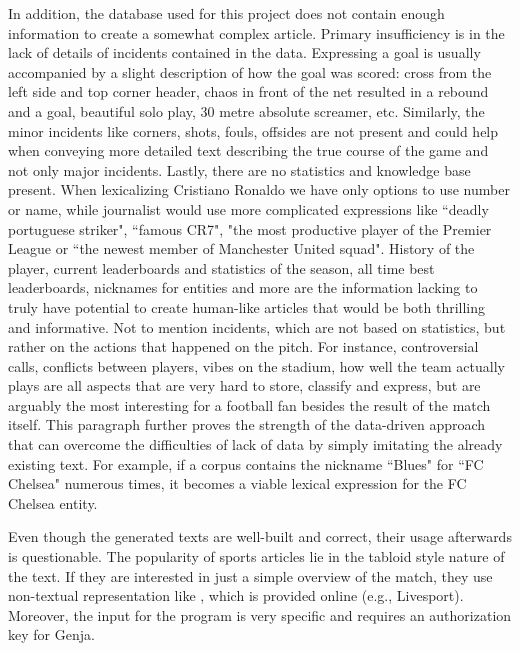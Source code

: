 In addition, the database used for this project does not contain enough information to create a somewhat complex article. Primary insufficiency is in the lack of details of incidents contained in the data. Expressing a goal is usually accompanied by a slight description of how the goal was scored: cross from the left side and top corner header, chaos in front of the net resulted in a rebound and a goal, beautiful solo play, 30 metre absolute screamer, etc. Similarly, the minor incidents like corners, shots, fouls, offsides are not present and could help when conveying more detailed text describing the true course of the game and not only major incidents. Lastly, there are no statistics and knowledge base present. When lexicalizing Cristiano Ronaldo we have only options to use number or name, while journalist would use more complicated expressions like ``deadly portuguese striker", ``famous CR7", "the most productive player of the Premier League or ``the newest member of Manchester United squad". History of the player, current leaderboards and statistics of the season, all time best leaderboards, nicknames for entities and more are the information lacking to truly have potential to create human-like articles that would be both thrilling and informative. Not to mention incidents, which are not based on statistics, but rather on the actions that happened on the pitch. For instance, controversial calls, conflicts between players, vibes on the stadium, how well the team actually plays are all aspects that are very hard to store, classify and express, but are arguably the most interesting for a football fan besides the result of the match itself. This paragraph further proves the strength of the data-driven approach that can overcome the difficulties of lack of data by simply imitating the already existing text. For example, if a corpus contains the nickname ``Blues" for ``FC Chelsea" numerous times, it becomes a viable lexical expression for the FC Chelsea entity.

Even though the generated texts are well-built and correct, their usage afterwards is questionable. The popularity of sports articles lie in the tabloid style nature of the text. If they are interested in just a simple overview of the match, they use non-textual representation like , which is provided online (e.g., Livesport). Moreover, the input for the program is very specific and requires an authorization key for Genja.

